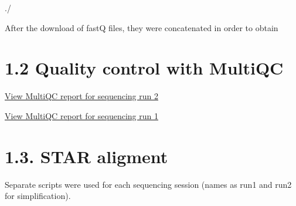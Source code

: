 \documentclass[
  letterpaper,
  DIV=11,
  numbers=noendperiod]{scrreprt}
\newenvironment{Shaded}{\begin{snugshade}}{\end{snugshade}}
\newcommand{\NormalTok}[1]{\textcolor[rgb]{0.00,0.23,0.31}{#1}}
\begin{document}
\begin{Shaded}
\end{Shaded}

\begin{Shaded}
\begin{Highlighting}[]
\NormalTok{./}
\end{Highlighting}
\end{Shaded}

After the download of fastQ files, they were concatenated in order to
obtain

\section{1.2 Quality control with
MultiQC}\label{quality-control-with-multiqc}

\href{./docs/Mouse/fastQC/run1/multiqc_report.html}{View MultiQC report
for sequencing run 2}

\href{./docs/Mouse/fastQC/run2/multiqc_report.html}{View MultiQC report
for sequencing run 1}

\section{1.3. STAR aligment}\label{star-aligment}

Separate scripts were used for each sequencing session (names as run1
and run2 for simplification).
\end{document}
